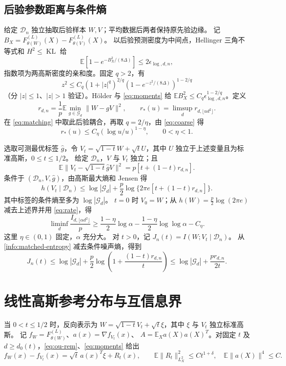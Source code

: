 \documentclass[a4paper]{tufte-handout}
\newcommand{\E}{\mathbb E}
\DeclareMathOperator{\KL}{KL}
\begin{document}
\begin{fullwidth}
\subsection{后验参数距离与条件熵}
给定 $\mathcal D_n$ 独立抽取后验样本 $W,V$；平均数据后两者保持原先验边缘。
记 $B_X=F_{\theta(W)}^{(L)}(X)-F_{\theta(V)}^{(L)}(X)$。
以后验预测密度为中间点，Hellinger 三角不等式和 $H^2\le\KL$ 给
\begin{equation}\label{eq:hellinger}
 \E[1-e^{-B_X^2/(8\Delta)}]\le2\epsilon_{\log,d,n},
\end{equation}
指数项为两高斯密度的亲和度。固定 $q>2$，有
\[
 z^2\le C_q(1+|z|^q)^{2/q}
          (1-e^{-z^2/(8\Delta)})^{1-2/q}
\]
（分 $|z|\le1$、$|z|>1$ 验证）。H\"older 与 \eqref{eq:moments} 给
$\E B_X^2\le C_q\epsilon_{\log,d,n}^{1-2/q}$。定义
\[
 r_{d,n}=\frac1p\E\min_{g\in\mathcal G_d}\|W-gV\|^2,
 \qquad r_*(u)=\limsup_d r_{d,\lfloor ud^2\rfloor}.
\]
在 \eqref{eq:matching} 中取此后验耦合，再取 $q=2/\eta$，由 \eqref{eq:coarse} 得
\begin{equation}\label{eq:rate}
 r_*(u)\le C_\eta(\log u/u)^{1-\eta},\qquad0<\eta<1.
\end{equation}

选取可测最优标签 $\widehat g$，令
$V_t=\sqrt{1-t}W+\sqrt tU$，其中 $U$ 独立于上述变量且为标准高斯，$0\le t\le1/2$。
给定 $\mathcal D_n$，$V$ 与 $V_t$ 独立；且
\[
 \E\|V_t-\sqrt{1-t}\widehat gV\|^2=p[t+(1-t)r_{d,n}].
\]
条件于 $(\mathcal D_n,V,\widehat g)$，由高斯最大熵和 Jensen 得
\begin{equation}\label{info:matched-entropy}
 h(V_t\mid\mathcal D_n)
 \le\log|\mathcal G_d|+\frac p2\log\{2\pi e[t+(1-t)r_{d,n}]\}.
\end{equation}
其中标签的条件熵至多为 $\log|\mathcal G_d|$。
$t=0$ 时 $V_0=W$；从 $h(W)=\frac p2\log(2\pi e)$ 减去上述界并用 \eqref{eq:rate}，得
\begin{equation}\label{eq:sample-information-lower}
 \liminf_d\frac{I_{d,\lfloor\alpha d^2\rfloor}}p
 \ge\frac{1-\eta}{2}\log\alpha
       -\frac{1-\eta}{2}\log\log\alpha-C_\eta.
\end{equation}
这里 $\eta\in(0,1)$ 固定，$\alpha$ 充分大。
对 $t>0$，记 $J_n(t)=I(W;V_t\mid\mathcal D_n)$。
从 \eqref{info:matched-entropy} 减去条件噪声熵，得到
\begin{equation}\label{alt:oracle-cost}
 J_n(t)\le\log|\mathcal G_d|+\frac p2\log\left(1+\frac{(1-t)r_{d,n}}t\right)
 \le\log|\mathcal G_d|+\frac{p r_{d,n}}{2t}.
\end{equation}

\section{线性高斯参考分布与互信息界}
当 $0<t\le1/2$ 时，反向表示为
$W=\sqrt{1-t}V_t+\sqrt t\xi$，其中 $\xi$ 与 $V_t$ 独立标准高斯。
记 $f_W=F_{\theta(W)}^{(L)}$、$a(x)=\nabla f_{V_t}(x)$、
$A=\E_Xa(X)a(X)^T$。对固定 $t$ 及 $d\ge d_0(t)$，\eqref{eq:ou-rem}、\eqref{eq:moments} 给出
\[
 f_W(x)-f_{V_t}(x)=\sqrt t\,a(x)^T\xi+R_t(x),\qquad
 \E\|R_t\|_{L_X^2}^2\le Ct^{1+\delta},\quad
 \E\|a(X)\|^4\le C.
\]



\end{fullwidth}
\end{document}
